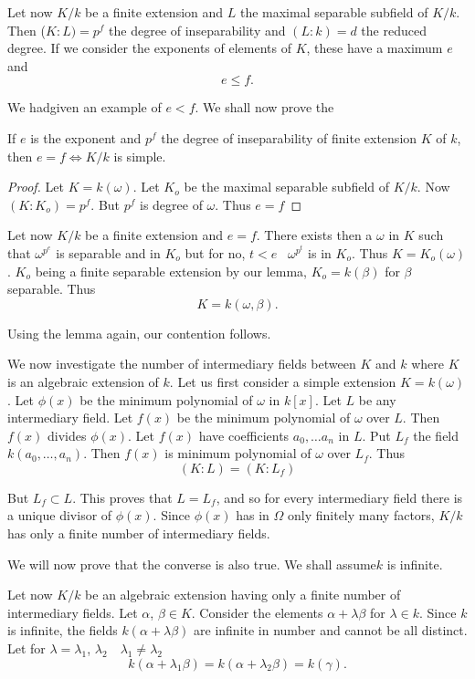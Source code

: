 Let now $K/k$ be a finite extension and $L$ the maximal separable
subfield of $K/k$. Then ($K : L) = p^f$ the degree of inseparability
and $(L : k) = d$ the reduced degree. If we consider the exponents of
elements of $K$, these have a maximum $e$ and  
$$
e \le f.
$$

We had\pageoriginale given an example of $e < f$. We shall now prove
the  

\begin{thm}\label{c2:thm5}%
If $e$ is the exponent and $p^f$ the degree of
  inseparability of finite extension $K$ of $k$, then $e = f
\Longleftrightarrow K/k$ is simple. 
\end{thm}

\begin{proof}
Let $K = k(\omega)$. Let $K_o$ be the maximal separable subfield of
$K/k$. Now $(K : K_o) = p^f$. But $p^f$ is degree of $\omega$. Thus $e
= f$ 
\end{proof}

Let now $K /k$ be a finite extension and $e = f$. There exists then a
$\omega$ in $K$ such that $\omega^{p^e}$ is separable and in $K_o$ but
for no, $t < e$ \, $\omega^{p^t}$ is in $K_o$. Thus $K = K_o (\omega)$. $K_o$
being a finite separable extension by our lemma, $K_o = k(\beta)$ for
$\beta$ separable. Thus  
$$
K = k (\omega, \beta ).
$$

Using the lemma again, our contention follows.

We now investigate the number of intermediary fields between $K$ and
$k$ where $K$ is an algebraic extension of $k$. Let us first consider
a simple extension $K = k(\omega)$. Let $\phi (x)$ be the minimum
polynomial of $\omega$ in $k[x]$. Let $L$ be any intermediary
field. Let $f(x)$ be the minimum polynomial of $\omega$ over $L$. Then
$f(x)$ divides $\phi(x)$. Let $f(x)$ have coefficients $a_0 , \ldots
a_n$ in $L$. Put $L_f$ the field $k(a_0 , \ldots , a_n)$. Then $f(x)$
is minimum polynomial of $\omega$ over $L_f$. Thus  
$$
(K : L) = (K : L_f)
$$

But $L_f \subset L$. This proves that $L = L_f$, and so for every
intermediary field there is a unique divisor of $\phi (x)$. Since
$\phi(x)$ has in $\Omega$ only finitely many factors, $K/k$ has only a
finite number of intermediary fields. 

We will now prove that the converse is also true. We shall
assume\pageoriginale $k$ is infinite.  

Let now $K/k$ be an algebraic extension having only a finite number of
intermediary fields. Let $\alpha$, $\beta \in K$. Consider the elements
$\alpha + \lambda \beta$ for $\lambda \in k$. Since $k$ is infinite,
the fields $k(\alpha + \lambda \beta)$ are infinite in number and
cannot be all distinct. Let for $\lambda = \lambda_1$, $\lambda_2 \quad
\lambda_1 \neq \lambda_2$ 
$$
k(\alpha + \lambda_1 \beta) = k(\alpha + \lambda_2 \beta) =
k(\gamma). 
$$


